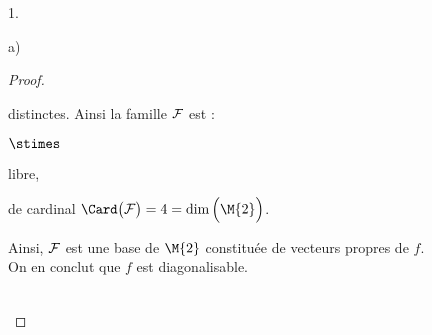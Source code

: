 \documentclass[11pt]{article}%
\begin{document}
\begin{noliste}{1.}
\begin{noliste}{a)}
\begin{proof}
\begin{remark}
        distinctes. Ainsi la famille ${\cal F}$ est :
        \begin{noliste}{$\stimes$}
        \item libre,
        \item de cardinal $\Card\big( {\cal F} \big) = 4 = \dim\Big(
          \M{2} \Big)$.         
        \end{noliste}
        Ainsi, ${\cal F}$ est une base de $\M{2}$ constituée de
        vecteurs propres de $f$.\\
        On en conclut que $f$ est diagonalisable.
      \end{remark}~\\[-1.8cm]
    \end{proof}
  \end{noliste}



\end{noliste}
\end{document}
